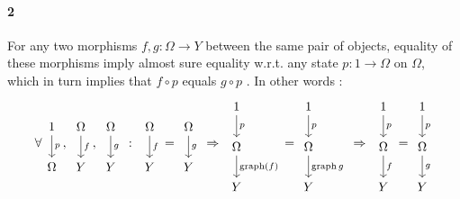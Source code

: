 \documentclass[12pt,oneside,pb-diagram]{article}
\DeclareMathOperator{\graph}{graph}
\begin{document}
\paragraph{2} For any two morphisms $f,g : \Omega \to Y$ between the same pair of objects, equality of these morphisms imply almost sure equality w.r.t. any state $p:1\to \Omega$ on $\Omega$, which in turn implies that $f\circ p$ equals $g\circ p$ . In other words :
%
\begin{equation}
	\forall
	\begin{tikzcd} 1 \arrow[d, "p"] \\ \Omega \end{tikzcd} ,\, 
	\begin{tikzcd} \Omega \arrow[d, "f"] \\ Y \end{tikzcd} ,\, 
	\begin{tikzcd} \Omega \arrow[d, "g"] \\ Y \end{tikzcd} \;:\;
	\begin{tikzcd} \Omega \arrow[d, "f"] \\ Y \end{tikzcd} = 
	\begin{tikzcd} \Omega \arrow[d, "g"] \\ Y \end{tikzcd} \;\Rightarrow\; 
	\begin{tikzcd} 1 \arrow[d, "p"] \\ \Omega \arrow[d, "\graph(f)"] \\ Y \end{tikzcd} = 
	\begin{tikzcd} 1 \arrow[d, "p"] \\ \Omega \arrow[d, "\graph{g}"] \\ Y \end{tikzcd} \;\Rightarrow\;   
	\begin{tikzcd} 1 \arrow[d, "p"] \\ \Omega \arrow[d, "f"] \\ Y \end{tikzcd} = 
	\begin{tikzcd} 1 \arrow[d, "p"] \\ \Omega \arrow[d, "g"] \\ Y \end{tikzcd} 
\end{equation}
%
\end{document}
